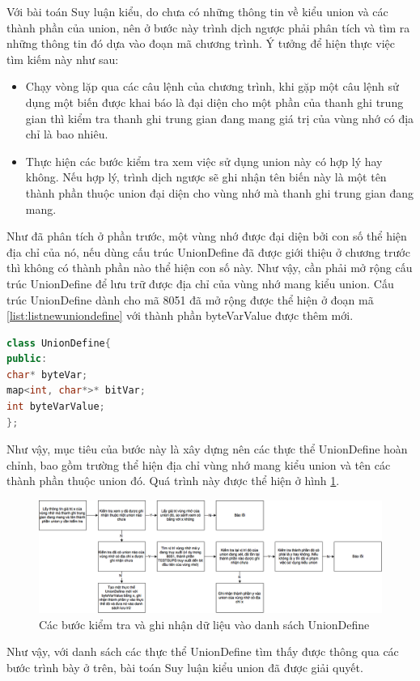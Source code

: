 Với bài toán Suy luận kiểu, do chưa có những thông tin về kiểu union và các thành phần của union, nên ở bước này trình dịch ngược phải phân tích và tìm ra những thông tin đó dựa vào đoạn mã chương trình. Ý tưởng để hiện thực việc tìm kiếm này như sau:
\begin{itemize}
	\item Chạy vòng lặp qua các câu lệnh của chương trình, khi gặp một câu lệnh sử dụng một biến được khai báo là đại diện cho một phần của thanh ghi trung gian thì kiểm tra thanh ghi trung gian đang mang giá trị của vùng nhớ có địa chỉ là bao nhiêu. 
	\item Thực hiện các bước kiểm tra xem việc sử dụng union này có hợp lý hay không. Nếu hợp lý, trình dịch ngược sẽ ghi nhận tên biến này là một tên thành phần thuộc union đại diện cho vùng nhớ mà thanh ghi trung gian đang mang. 
\end{itemize}
Như đã phân tích ở phần trước, một vùng nhớ được đại diện bởi con số thể hiện địa chỉ của nó, nếu dùng cấu trúc UnionDefine đã được giới thiệu ở chương trước thì không có thành phần nào thể hiện con số này. Như vậy, cần phải mở rộng cấu trúc UnionDefine để lưu trữ được địa chỉ của vùng nhớ mang kiểu union. Cấu trúc UnionDefine dành cho mã 8051 đã mở rộng được thể hiện ở đoạn mã \ref{list:listnewuniondefine} với thành phần byteVarValue được thêm mới.
\begin{lstlisting}[caption={Đoạn mã mới của class UnionDefine},label={list:listnewuniondefine},language=c++]
class UnionDefine{
public:
char* byteVar;
map<int, char*>* bitVar;
int byteVarValue;
};
\end{lstlisting}
Như vậy, mục tiêu của bước này là xây dựng nên các thực thể UnionDefine hoàn chỉnh, bao gồm trường thể hiện địa chỉ vùng nhớ mang kiểu union và tên các thành phần thuộc union đó. Quá trình này được thể hiện ở hình \ref{fig:stepunionmaking}.
\begin{figure}[h]
	\centering
	\includegraphics[width=0.7\linewidth]{image/stepUnionMaking}
	\caption{Các bước kiểm tra và ghi nhận dữ liệu vào danh sách UnionDefine}
	\label{fig:stepunionmaking}
\end{figure}

Như vậy, với danh sách các thực thể UnionDefine tìm thấy được thông qua các bước trình bày ở trên, bài toán Suy luận kiểu union đã được giải quyết.